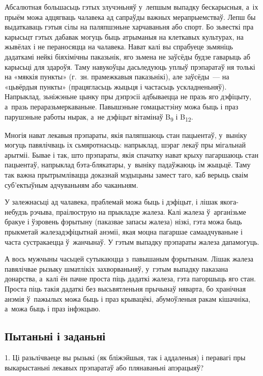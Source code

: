 Абсалютная большасьць гэтых злучэньняў у~лепшым выпадку бескарысныя, а~іх прыём можа адцягваць чалавека ад сапраўды важных мерапрыемстваў. Лепш бы выдаткаваць гэтыя сілы на паляпшэньне харчаваньня або спорт. Бо зьвесткі пра карысьцт гэтых дабавак могуць быць атрыманыя на клеткавых культурах, на жывёлах і не пераносяцца на чалавека. Нават калі вы спрабуеце зьмяніць дадаткамі нейкі біяхімічны паказьнік, яго зьмена не заўсёды будзе гаварыць аб карысьці для здароўя. Таму навукоўцы дасьледуюць уплыў прэпаратаў ня толькі на «мяккія пункты» (г.~зн. прамежкавыя паказьнікі), але заўсёды~--- на «цьвёрдыя пункты» (працягласьць жыцьця і частасьць ускладненьняў). Напрыклад, зьніжэньне цынку пры дэпрэсіі адбываецца не празь яго дэфіцыту, а~празь пераразьмеркаваньне. Павышэньне гомацыстэіну можа быць і праз парушэньне работы нырак, а~не дэфіцыт вітамінаў B\textsubscript{9} і B\textsubscript{12}.

Многія нават лекавыя прэпараты, якія паляпшаюць стан пацыентаў, у~выніку могуць павялічваць іх сьмяротнасьць: напрыклад, шэраг лекаў пры мігальнай арытміі. Бывае і так, што прэпараты, якія спачатку нават крыху пагаршаюць стан пацыентаў, напрыклад бэта-блякатары, у~выніку падаўжаюць ім жыцьцё. Таму так важна прытрымлівацца доказнай мэдыцыны замест таго, каб верыць сваім суб'ектыўным адчуваньням або чаканьням.

У залежнасьці ад чалавека, праблемай можа быць і дэфіцыт, і лішак якога-небудзь рэчыва, праілюструю на прыкладзе жалеза. Калі жалеза ў~арганізьме бракуе і ўзровень фэрытыну (паказвае запасы жалеза) нізкі, гэта можа быць прыкметай жалезадэфіцытнай анэміі, якая моцна пагаршае самаадчуваньне і часта сустракаецца ў~жанчынаў. У гэтым выпадку прэпараты жалеза дапамогуць.

А вось мужчыны часьцей сутыкаюцца з~павышаным фэрытынам. Лішак жалеза павялічвае рызыку шматлікіх захворваньняў, у~гэтым выпадку паказана донарства, а~калі ён пачне проста піць дадаткі жалеза, гэта пагоршыць яго стан. Проста піць такія дадаткі без высьвятленьня прычынаў няварта, бо хранічная анэмія ў~пажылых можа быць і праз крывацёкі, абумоўленыя ракам кішачніка, а~можа быць і праз інфэкцыю.

\subsection*{Пытаньні і заданьні}

1. Ці разьлічваеце вы рызыкі (як бліжэйшыя, так і аддаленыя) і перавагі пры выкарыстаньні лекавых прэпаратаў або плянаваньні апэрацыяў?

